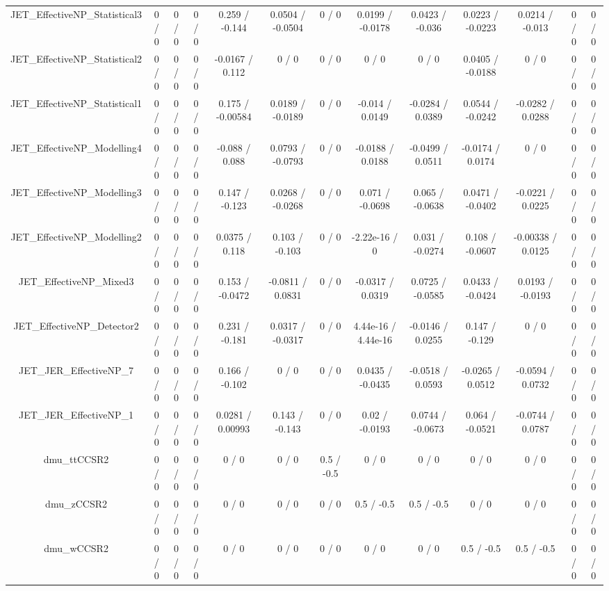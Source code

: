 \documentclass[10pt]{article}
\begin{document}
\begin{table}[htbp]
\begin{center}
\begin{tabular}{|c|c|c|c|c|c|c|c|c|c|c|c|c|}
  JET_EffectiveNP_Statistical3 & 0 / 0 & 0 / 0 & 0 / 0 & 0.259 / -0.144 & 0.0504 / -0.0504 & 0 / 0 & 0.0199 / -0.0178 & 0.0423 / -0.036 & 0.0223 / -0.0223 & 0.0214 / -0.013 & 0 / 0 & 0 / 0 \\ 
  JET_EffectiveNP_Statistical2 & 0 / 0 & 0 / 0 & 0 / 0 & -0.0167 / 0.112 & 0 / 0 & 0 / 0 & 0 / 0 & 0 / 0 & 0.0405 / -0.0188 & 0 / 0 & 0 / 0 & 0 / 0 \\ 
  JET_EffectiveNP_Statistical1 & 0 / 0 & 0 / 0 & 0 / 0 & 0.175 / -0.00584 & 0.0189 / -0.0189 & 0 / 0 & -0.014 / 0.0149 & -0.0284 / 0.0389 & 0.0544 / -0.0242 & -0.0282 / 0.0288 & 0 / 0 & 0 / 0 \\ 
  JET_EffectiveNP_Modelling4 & 0 / 0 & 0 / 0 & 0 / 0 & -0.088 / 0.088 & 0.0793 / -0.0793 & 0 / 0 & -0.0188 / 0.0188 & -0.0499 / 0.0511 & -0.0174 / 0.0174 & 0 / 0 & 0 / 0 & 0 / 0 \\ 
  JET_EffectiveNP_Modelling3 & 0 / 0 & 0 / 0 & 0 / 0 & 0.147 / -0.123 & 0.0268 / -0.0268 & 0 / 0 & 0.071 / -0.0698 & 0.065 / -0.0638 & 0.0471 / -0.0402 & -0.0221 / 0.0225 & 0 / 0 & 0 / 0 \\ 
  JET_EffectiveNP_Modelling2 & 0 / 0 & 0 / 0 & 0 / 0 & 0.0375 / 0.118 & 0.103 / -0.103 & 0 / 0 & -2.22e-16 / 0 & 0.031 / -0.0274 & 0.108 / -0.0607 & -0.00338 / 0.0125 & 0 / 0 & 0 / 0 \\ 
  JET_EffectiveNP_Mixed3 & 0 / 0 & 0 / 0 & 0 / 0 & 0.153 / -0.0472 & -0.0811 / 0.0831 & 0 / 0 & -0.0317 / 0.0319 & 0.0725 / -0.0585 & 0.0433 / -0.0424 & 0.0193 / -0.0193 & 0 / 0 & 0 / 0 \\ 
  JET_EffectiveNP_Detector2 & 0 / 0 & 0 / 0 & 0 / 0 & 0.231 / -0.181 & 0.0317 / -0.0317 & 0 / 0 & 4.44e-16 / 4.44e-16 & -0.0146 / 0.0255 & 0.147 / -0.129 & 0 / 0 & 0 / 0 & 0 / 0 \\ 
  JET_JER_EffectiveNP_7 & 0 / 0 & 0 / 0 & 0 / 0 & 0.166 / -0.102 & 0 / 0 & 0 / 0 & 0.0435 / -0.0435 & -0.0518 / 0.0593 & -0.0265 / 0.0512 & -0.0594 / 0.0732 & 0 / 0 & 0 / 0 \\ 
  JET_JER_EffectiveNP_1 & 0 / 0 & 0 / 0 & 0 / 0 & 0.0281 / 0.00993 & 0.143 / -0.143 & 0 / 0 & 0.02 / -0.0193 & 0.0744 / -0.0673 & 0.064 / -0.0521 & -0.0744 / 0.0787 & 0 / 0 & 0 / 0 \\ 
  dmu_ttCCSR2 & 0 / 0 & 0 / 0 & 0 / 0 & 0 / 0 & 0 / 0 & 0.5 / -0.5 & 0 / 0 & 0 / 0 & 0 / 0 & 0 / 0 & 0 / 0 & 0 / 0 \\ 
  dmu_zCCSR2 & 0 / 0 & 0 / 0 & 0 / 0 & 0 / 0 & 0 / 0 & 0 / 0 & 0.5 / -0.5 & 0.5 / -0.5 & 0 / 0 & 0 / 0 & 0 / 0 & 0 / 0 \\ 
  dmu_wCCSR2 & 0 / 0 & 0 / 0 & 0 / 0 & 0 / 0 & 0 / 0 & 0 / 0 & 0 / 0 & 0 / 0 & 0.5 / -0.5 & 0.5 / -0.5 & 0 / 0 & 0 / 0 \\ 

\end{tabular}
\end{center}
\end{table}
\end{document}

